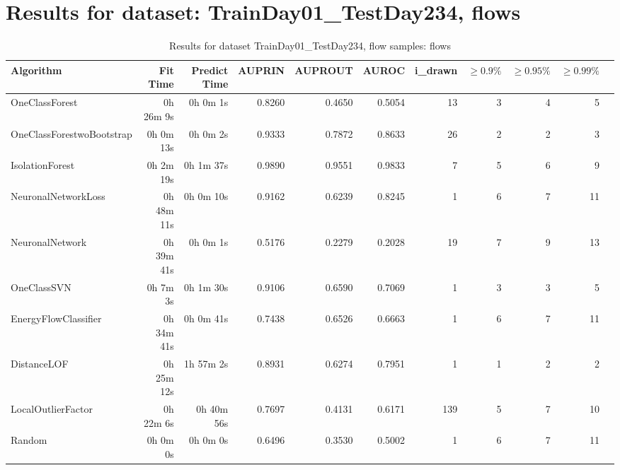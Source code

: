 \documentclass{article}
\begin{document}
\section*{Results for dataset: TrainDay01_TestDay234, flows}
\begin{table}[h!]
\centering
\caption{Results for dataset TrainDay01_TestDay234, flow samples: flows}
\begin{tabular}{lrrrrrrrrrr}
\toprule
Algorithm & Fit Time & Predict Time & AUPRIN & AUPROUT & AUROC & i\_drawn & $\geq 0.9\%$ & $\geq 0.95\%$ & $\geq 0.99\%$ \\
\midrule
OneClassForest & 0h 26m 9s & 0h 0m 1s & 0.8260 & 0.4650 & 0.5054 & 13 & 3 & 4 & 5 \\
OneClassForestwoBootstrap & 0h 0m 13s & 0h 0m 2s & 0.9333 & 0.7872 & 0.8633 & 26 & 2 & 2 & 3 \\
IsolationForest & 0h 2m 19s & 0h 1m 37s & 0.9890 & 0.9551 & 0.9833 & 7 & 5 & 6 & 9 \\
NeuronalNetworkLoss & 0h 48m 11s & 0h 0m 10s & 0.9162 & 0.6239 & 0.8245 & 1 & 6 & 7 & 11 \\
NeuronalNetwork & 0h 39m 41s & 0h 0m 1s & 0.5176 & 0.2279 & 0.2028 & 19 & 7 & 9 & 13 \\
OneClassSVN & 0h 7m 3s & 0h 1m 30s & 0.9106 & 0.6590 & 0.7069 & 1 & 3 & 3 & 5 \\
EnergyFlowClassifier & 0h 34m 41s & 0h 0m 41s & 0.7438 & 0.6526 & 0.6663 & 1 & 6 & 7 & 11 \\
DistanceLOF & 0h 25m 12s & 1h 57m 2s & 0.8931 & 0.6274 & 0.7951 & 1 & 1 & 2 & 2 \\
LocalOutlierFactor & 0h 22m 6s & 0h 40m 56s & 0.7697 & 0.4131 & 0.6171 & 139 & 5 & 7 & 10 \\
Random & 0h 0m 0s & 0h 0m 0s & 0.6496 & 0.3530 & 0.5002 & 1 & 6 & 7 & 11 \\
\bottomrule
\end{tabular}
\end{table}
\end{document}
